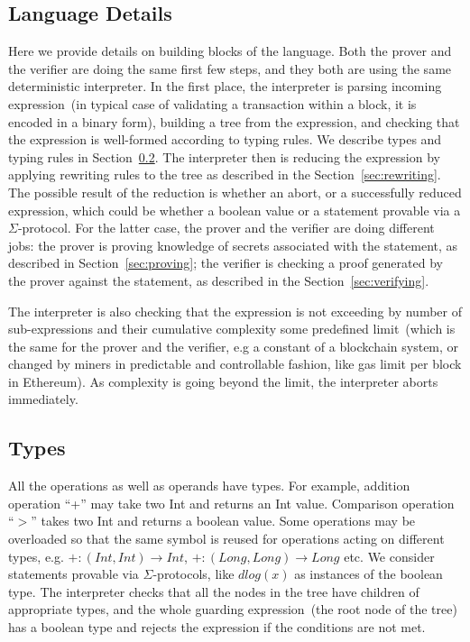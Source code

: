 \documentclass[11pt]{article}
\begin{document}
\subsection{Language Details} 
\label{sec:lang-details}

Here we provide details on building blocks of the language.  
Both the prover and the verifier are doing the same first few steps, and they both are using the same deterministic interpreter. In the first place, the interpreter is parsing incoming expression~(in typical case of validating a transaction within a block, it is encoded in a binary form), building a tree from the expression, and checking that the expression is well-formed according to typing rules. We describe types and typing rules in Section~\ref{sec:types}. The interpreter then is reducing the expression by applying rewriting rules to the tree as described in the Section~\ref{sec:rewriting}. The possible result of the reduction is whether an abort, or a successfully reduced expression, which could be whether a boolean value or a statement provable via a $\Sigma$-protocol. For the latter case, the prover and the verifier are doing different jobs: the prover is proving knowledge of secrets associated with the statement, as described in Section~\ref{sec:proving}; the verifier is checking a proof generated by the prover against the statement, as described in the Section~\ref{sec:verifying}.   

The interpreter is also checking that the expression is not exceeding by number of sub-expressions and their cumulative complexity some predefined limit~(which is the same for the prover and the verifier, e.g a constant of a blockchain system, or changed by miners in predictable and controllable fashion, like gas limit per block in Ethereum). As complexity is going beyond the limit, the interpreter aborts immediately. 


\subsection{Types}
\label{sec:types}

All the operations as well as operands have types. For example, addition operation ``+'' may take two Int and returns an Int value. Comparison operation ``$>$'' takes two Int and returns a boolean value. Some operations may be overloaded so that the same symbol is reused for operations acting on different types, e.g. $+: (Int,Int) \to Int$, $+: (Long, Long) \to Long$ etc.
We consider statements provable via $\Sigma$-protocols, like $dlog(x)$ as instances of the boolean type. The interpreter checks that all the nodes in the tree have children of appropriate types, and the whole guarding expression~(the root node of the tree) has a boolean type and rejects the expression if the conditions are not met.
\end{document}
